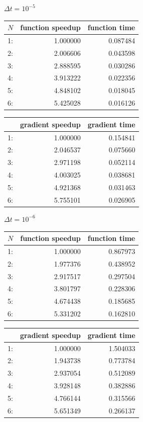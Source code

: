 \begin{center}
$\Delta t=10^{-5}$\\
\begin{tabular}{lrr}
\toprule
{}$N$ &  function speedup &    function  time \\
\midrule
1: &  1.000000 &  0.087484 \\
2: &  2.006606 &  0.043598 \\
3: &  2.888595 &  0.030286 \\
4: &  3.913222 &  0.022356 \\
5: &  4.848102 &  0.018045 \\
6: &  5.425028 &  0.016126 \\
\bottomrule
\end{tabular}
\begin{tabular}{lrr}
\toprule
{} &  gradient speedup &     gradient time \\
\midrule
1: &  1.000000 &  0.154841 \\
2: &  2.046537 &  0.075660 \\
3: &  2.971198 &  0.052114 \\
4: &  4.003025 &  0.038681 \\
5: &  4.921368 &  0.031463 \\
6: &  5.755101 &  0.026905 \\
\bottomrule
\end{tabular}
\end{center}
\begin{center}
$\Delta t=10^{-6}$\\
\begin{tabular}{lrr}
\toprule
{} $N$&  function speedup &    function time \\
\midrule
1: &  1.000000 &  0.867973 \\
2: &  1.977376 &  0.438952 \\
3: &  2.917517 &  0.297504 \\
4: &  3.801797 &  0.228306 \\
5: &  4.674438 &  0.185685 \\
6: &  5.331202 &  0.162810 \\
\bottomrule
\end{tabular}
\begin{tabular}{lrr}
\toprule
{} &  gradient speedup &    gradient time \\
\midrule
1: &  1.000000 &  1.504033 \\
2: &  1.943738 &  0.773784 \\
3: &  2.937054 &  0.512089 \\
4: &  3.928148 &  0.382886 \\
5: &  4.766144 &  0.315566 \\
6: &  5.651349 &  0.266137 \\
\bottomrule
\end{tabular}
\end{center}
